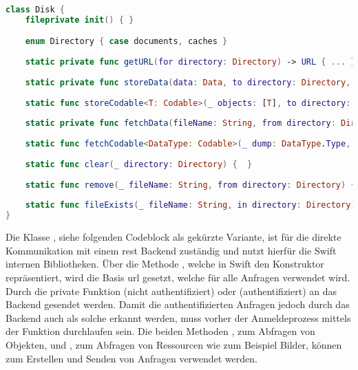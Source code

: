 \begin{lstlisting}[language=Swift]
class Disk {
    fileprivate init() { }

    enum Directory { case documents, caches }
    
    static private func getURL(for directory: Directory) -> URL { ... }
    
    static private func storeData(data: Data, to directory: Directory, as fileName: String) { ... }
    
    static func storeCodable<T: Codable>(_ objects: [T], to directory: Directory, as fileName: String) { ... }
    
    static private func fetchData(fileName: String, from directory: Directory) -> Data { ... }
    
    static func fetchCodable<DataType: Codable>(_ dump: DataType.Type, fileName: String, from directory: Directory) -> [DataType]? { ...  }
    
    static func clear(_ directory: Directory) {  }
    
    static func remove(_ fileName: String, from directory: Directory) { ... }
    
    static func fileExists(_ fileName: String, in directory: Directory) -> Bool { ... }
}
\end{lstlisting}

Die Klasse , siehe folgenden Codeblock als gekürzte Variante, ist für die direkte Kommunikation mit einem \gls{rest} Backend zuständig und nutzt hierfür die Swift internen Bibliotheken.
Über die Methode , welche in Swift den Konstruktor repräsentiert, wird die Basis \gls{url} gesetzt, welche für alle Anfragen verwendet wird.
Durch die private Funktion  (nicht authentifiziert) oder  (authentifiziert) an das Backend gesendet werden. Damit die authentifizierten Anfragen jedoch durch das Backend auch als solche erkannt werden, muss vorher der Anmeldeprozess mittels der Funktion  durchlaufen sein.
Die beiden Methoden , zum Abfragen von Objekten, und , zum Abfragen von Ressourcen wie zum Beispiel Bilder, können zum Erstellen und Senden von Anfragen verwendet werden.

